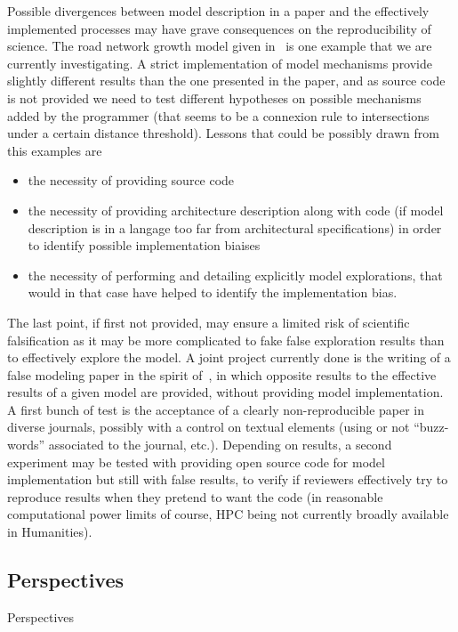 
Possible divergences between model description in a paper and the effectively implemented processes may have grave consequences on the reproducibility of science. The road network growth model given in~\cite{barthelemy2008modeling} is one example that we are currently investigating. A strict implementation of model mechanisms provide slightly different results than the one presented in the paper, and as source code is not provided we need to test different hypotheses on possible mechanisms added by the programmer (that seems to be a connexion rule to intersections under a certain distance threshold). Lessons that could be possibly drawn from this examples are 
\begin{itemize}
\item the necessity of providing source code
\item the necessity of providing architecture description along with code (if model description is in a langage too far from architectural specifications) in order to identify possible implementation biaises
\item the necessity of performing and detailing explicitly model explorations, that would in that case have helped to identify the implementation bias.
\end{itemize}

The last point, if first not provided, may ensure a limited risk of scientific falsification as it may be more complicated to fake false exploration results than to effectively explore the model. A joint project currently done is the writing of a false modeling paper in the spirit of~\cite{zilsel2015canular}, in which opposite results to the effective results of a given model are provided, without providing model implementation. A first bunch of test is the acceptance of a clearly non-reproducible paper in diverse journals, possibly with a control on textual elements (using or not ``buzz-words'' associated to the journal, etc.). Depending on results, a second experiment may be tested with providing open source code for model implementation but still with false results, to verify if reviewers effectively try to reproduce results when they pretend to want the code (in reasonable computational power limits of course, HPC being not currently broadly available in Humanities).



\subsection{Perspectives}{Perspectives}


